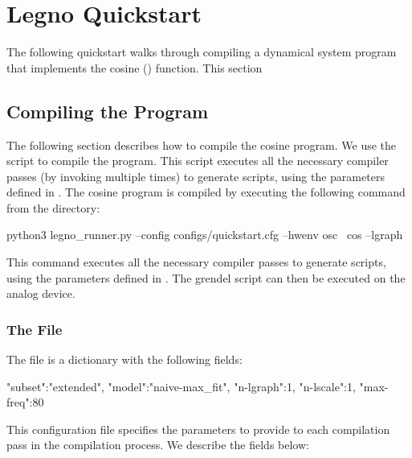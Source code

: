 \chapter{Legno Quickstart}

The following quickstart walks through compiling a dynamical system program that
implements the cosine () function. This section 


\section{Compiling the  Program}

The following section describes how to compile the cosine program. We use the
 script to compile the program. This script executes all
the necessary compiler passes (by invoking  multiple times)
to generate  scripts, using the parameters defined in
. The cosine program is compiled by executing the following
command from the  directory:

\begin{snippet}
  python3 legno_runner.py --config configs/quickstart.cfg --hwenv osc  \
    cos --lgraph
\end{snippet}

This command executes all the necessary compiler passes to generate
\tx{.grendel} scripts, using the parameters defined in
. The grendel script can then be executed on the
analog device.

\begin{comment}
\noindent\textbf{Without Oscilloscope}: If you would like to compile the cosine
program without any oscilloscope support, change the \tx{--hwenv osc} argument to
\tx{--hwenv noosc}. 
\end{comment}

\subsection{The  File}

The  file is a  dictionary with the following fields:

\begin{snippet}
{
  "subset":"extended",
  "model":"naive-max_fit",
  "n-lgraph":1,
  "n-lscale":1,
  "max-freq":80
}
\end{snippet}

This configuration file specifies the parameters to provide to each compilation
pass in the compilation process. We describe the fields below:

